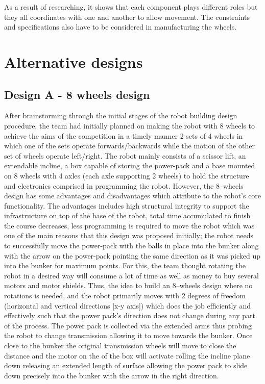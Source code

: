 \documentclass[12pt]{report}
\begin{document}
As a result of researching, it shows that each component plays different roles but they all coordinates with one and another to allow movement. The constraints and specifications also have to be considered in manufacturing the wheels.


\chapter{Alternative designs}
\section{Design A - 8 wheels design}
After brainstorming through the initial stages of the robot building design procedure, the team had initially planned on making the robot with 8 wheels to achieve the aims of the competition in a timely manner {2 sets of 4 wheels in which one of the sets operate forwards/backwards while the motion of the other set of wheels operate left/right}. The robot mainly consists of a scissor lift, an extendable incline, a box capable of storing the power-pack and a base mounted on 8 wheels with 4 axles (each axle supporting 2 wheels) to hold the structure and electronics comprised in programming the robot. 
However, the 8–wheels design has some advantages and disadvantages which attribute to the robot’s core functionality.  The advantages includes high structural integrity to support the infrastructure on top of the base of the robot, total time accumulated to finish the course decreases, less programming is required to move the robot which was one of the main reasons that this design was proposed initially; the robot needs to successfully move the power-pack with the balls in place into the bunker along with the arrow on the power-pack pointing the same direction as it was picked up into the bunker for maximum points. For this, the team thought rotating the robot in a desired way will consume a lot of time as well as money to buy several motors and motor shields. Thus, the idea to build an 8–wheels design where no rotations is needed, and the robot primarily moves with 2 degrees of freedom (horizontal and vertical directions [x-y axis]) which does the job efficiently and effectively such that the power pack’s direction does not change during any part of the process. The power pack is collected via the extended arms thus probing the robot to change transmission allowing it to move towards the bunker. Once close to the bunker the original transmission wheels will move to close the distance and the motor on the of the box will activate rolling the incline plane down releasing an extended length of surface allowing the power pack to slide down precisely into the bunker with the arrow in the right direction. 
\end{document}
